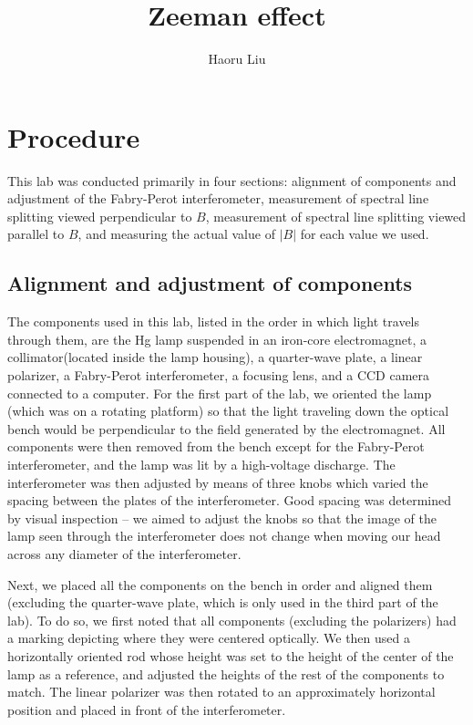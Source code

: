 \documentclass{amsart}
\title{Zeeman effect}
\author{Haoru Liu}
\begin{document}
\maketitle
{}
\tableofcontents
\section{Procedure}
This lab was conducted primarily in four sections: alignment of components and adjustment of the Fabry-Perot interferometer, measurement of spectral line splitting viewed perpendicular to $B$, measurement of spectral line splitting viewed parallel to $B$, and measuring the actual value of $|B|$ for each value we used. 
\subsection{Alignment and adjustment of components}
The components used in this lab, listed in the order in which light travels through them, are the Hg lamp suspended in an iron-core electromagnet, a collimator(located inside the lamp housing), a quarter-wave plate, a linear polarizer, a Fabry-Perot interferometer, a focusing lens, and a CCD camera connected to a computer. For the first part of the lab, we oriented the lamp (which was on a rotating platform) so that the light traveling down the optical bench would be perpendicular to the field generated by the electromagnet. All components were then removed from the bench except for the Fabry-Perot interferometer, and the lamp was lit by a high-voltage discharge. The interferometer was then adjusted by means of three knobs which varied the spacing between the plates of the interferometer. Good spacing was determined by visual inspection -- we aimed to adjust the knobs so that the image of the lamp seen through the interferometer does not change when moving our head across any diameter of the interferometer. 

Next, we placed all the components on the bench in order and aligned them (excluding the quarter-wave plate, which is only used in the third part of the lab). To do so, we first noted that all components (excluding the polarizers) had a marking depicting where they were centered optically. We then used a horizontally oriented rod whose height was set to the height of the center of the lamp as a reference, and adjusted the heights of the rest of the components to match. The linear polarizer was then rotated to an approximately horizontal position and placed in front of the interferometer. 
\end{document}
